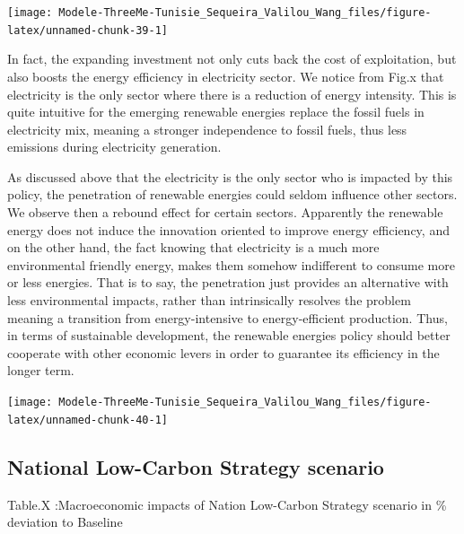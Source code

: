 \documentclass[
]{article}
\begin{document}
\begin{center}\texttt{[image: Modele-ThreeMe-Tunisie\_Sequeira\_Valilou\_Wang\_files/figure-latex/unnamed-chunk-39-1]} \end{center}

In fact, the expanding investment not only cuts back the cost of
exploitation, but also boosts the energy efficiency in electricity
sector. We notice from Fig.x that electricity is the only sector where
there is a reduction of energy intensity. This is quite intuitive for
the emerging renewable energies replace the fossil fuels in electricity
mix, meaning a stronger independence to fossil fuels, thus less
emissions during electricity generation.

As discussed above that the electricity is the only sector who is
impacted by this policy, the penetration of renewable energies could
seldom influence other sectors. We observe then a rebound effect for
certain sectors. Apparently the renewable energy does not induce the
innovation oriented to improve energy efficiency, and on the other hand,
the fact knowing that electricity is a much more environmental friendly
energy, makes them somehow indifferent to consume more or less energies.
That is to say, the penetration just provides an alternative with less
environmental impacts, rather than intrinsically resolves the problem
meaning a transition from energy-intensive to energy-efficient
production. Thus, in terms of sustainable development, the renewable
energies policy should better cooperate with other economic levers in
order to guarantee its efficiency in the longer term.

\begin{center}\texttt{[image: Modele-ThreeMe-Tunisie\_Sequeira\_Valilou\_Wang\_files/figure-latex/unnamed-chunk-40-1]} \end{center}

\hypertarget{national-low-carbon-strategy-scenario}{%
\subsection{National Low-Carbon Strategy
scenario}\label{national-low-carbon-strategy-scenario}}

Table.X :Macroeconomic impacts of Nation Low-Carbon Strategy scenario in
\% deviation to Baseline
\end{document}
